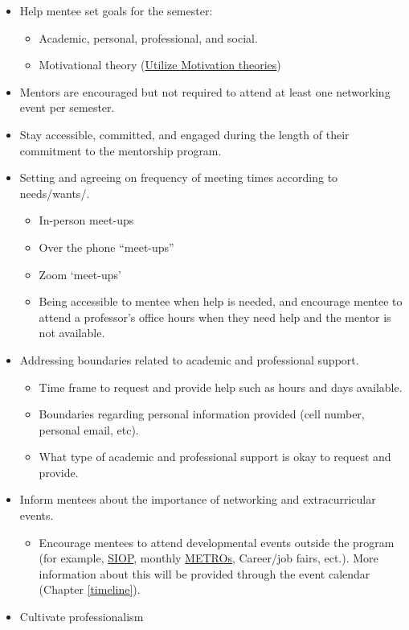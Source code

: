 \documentclass[
  openany]{book}
\providecommand{\tightlist}{%
  \setlength{\itemsep}{0pt}\setlength{\parskip}{0pt}}
\begin{document}
\begin{itemize}
\tightlist
\item
  Help mentee set goals for the semester:

  \begin{itemize}
  \tightlist
  \item
    Academic, personal, professional, and social.
  \item
    Motivational theory (\href{https://youtu.be/cgg9byUy-V4}{Utilize Motivation theories})
  \end{itemize}
\item
  Mentors are encouraged but not required to attend at least one networking event per semester.
\item
  Stay accessible, committed, and engaged during the length of their commitment to the mentorship program.
\item
  Setting and agreeing on frequency of meeting times according to needs/wants/.

  \begin{itemize}
  \tightlist
  \item
    In-person meet-ups
  \item
    Over the phone ``meet-ups''
  \item
    Zoom `meet-ups'
  \item
    Being accessible to mentee when help is needed, and encourage mentee to attend a professor's office hours when they need help and the mentor is not available.
  \end{itemize}
\item
  Addressing boundaries related to academic and professional support.

  \begin{itemize}
  \tightlist
  \item
    Time frame to request and provide help such as hours and days available.
  \item
    Boundaries regarding personal information provided (cell number, personal email, etc).
  \item
    What type of academic and professional support is okay to request and provide.
  \end{itemize}
\item
  Inform mentees about the importance of networking and extracurricular events.

  \begin{itemize}
  \tightlist
  \item
    Encourage mentees to attend developmental events outside the program (for example, \href{http://www.siop.org}{SIOP}, monthly \href{http://www.metroapppsych.com/}{METROs}, Career/job fairs, ect.). More information about this will be provided through the event calendar (Chapter \ref{timeline}).
  \end{itemize}
\item
  Cultivate professionalism


\end{itemize}
\end{document}
